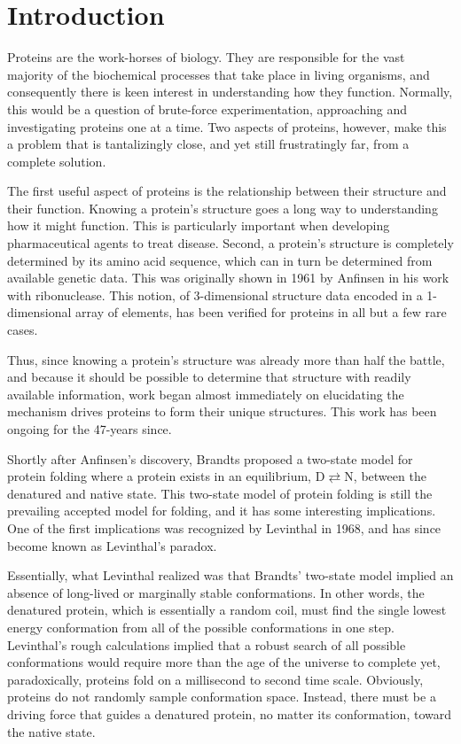 \section*{Introduction}
\label{sec:introduction}
Proteins are the work-horses of biology. They are responsible for the vast majority of the biochemical processes that take place in living organisms, and consequently there is keen interest in understanding how they function. Normally, this would be a question of brute-force experimentation, approaching and investigating proteins one at a time. Two aspects of proteins, however, make this a problem that is tantalizingly close, and yet still frustratingly far, from a complete solution.

The first useful aspect of proteins is the relationship between their structure and their function. Knowing a protein's structure goes a long way to understanding how it might function. This is particularly important when developing pharmaceutical agents to treat disease. Second, a protein's structure is completely determined by its amino acid sequence, which can in turn be determined from available genetic data. This was originally shown in 1961 by Anfinsen\cite{Service:2008p294} in his work with ribonuclease. This notion, of 3-dimensional structure data encoded in a 1-dimensional array of elements, has been verified for proteins in all but a few rare cases.

Thus, since knowing a protein's structure was already more than half the battle, and because it should be possible to determine that structure with readily available information, work began almost immediately on elucidating the mechanism drives proteins to form their unique structures. This work has been ongoing for the 47-years since.

Shortly after Anfinsen's discovery, Brandts proposed a two-state model for protein folding where a protein exists in an equilibrium, $\mathrm{D} \rightleftarrows \mathrm{N}$, between the denatured and native state\cite{Clark:2008p141}. This two-state model of protein folding is still the prevailing accepted model for folding, and it has some interesting implications. One of the first implications was recognized by Levinthal in 1968, and has since become known as Levinthal's paradox.

Essentially, what Levinthal realized was that Brandts' two-state model implied an absence of long-lived or marginally stable conformations. In other words, the denatured protein, which is essentially a random coil, must find the single lowest energy conformation from all of the possible conformations in one step. Levinthal's rough calculations implied that a robust search of all possible conformations would require more than the age of the universe to complete yet, paradoxically, proteins fold on a millisecond to second time scale. Obviously, proteins do not randomly sample conformation space. Instead, there must be a driving force that guides a denatured protein, no matter its conformation, toward the native state.

